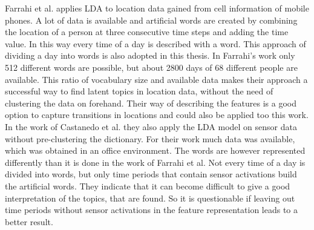 
Farrahi et al. \cite{farrahi2008daily} applies LDA to location data gained from cell information of mobile phones. A lot of data is available and artificial words are created by combining the location of a person at three consecutive time steps and adding the time value. In this way every time of a day is described with a word. This approach of dividing a day into words is also adopted in this thesis. In Farrahi's work only 512 different words are possible, but about 2800 days of 68 different people are available. This ratio of vocabulary size and available data makes their approach a successful way to find latent topics in location data, without the need of clustering the data on forehand. Their way of describing the features is a good option to capture transitions in locations and could also be applied too this work.\\

In the work of Castanedo et al. \cite{EXSY:EXSY12033} they also apply the LDA model on sensor data without pre-clustering the dictionary. For their work much data was available, which was obtained in an office environment. The words are however represented differently than it is done in the work of Farrahi et al. Not every time of a day is divided into words, but only time periods that contain sensor activations build the artificial words. They indicate that it can become difficult to give a good interpretation of the topics, that are found. So it is questionable if leaving out time periods without sensor activations in the feature representation leads to a better result.\\





